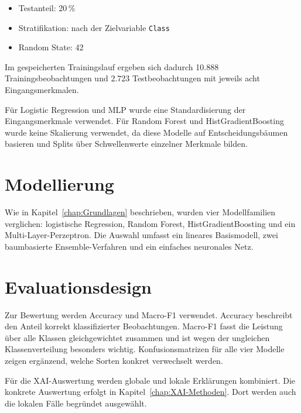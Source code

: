 \begin{itemize}
    \item Testanteil: 20\,\%
    \item Stratifikation: nach der Zielvariable \texttt{Class}
    \item Random State: 42
\end{itemize}

Im gespeicherten Trainingslauf ergeben sich dadurch 10.888 Trainingsbeobachtungen und 2.723 Testbeobachtungen mit jeweils acht Eingangsmerkmalen.

Für Logistic Regression und MLP wurde eine Standardisierung der Eingangsmerkmale verwendet. Für Random Forest und HistGradientBoosting wurde keine Skalierung verwendet, da diese Modelle auf Entscheidungsbäumen basieren und Splits über Schwellenwerte einzelner Merkmale bilden.

\section{Modellierung}

Wie in Kapitel~\ref{chap:Grundlagen} beschrieben, wurden vier Modellfamilien verglichen: logistische Regression, Random Forest, HistGradientBoosting und ein Multi-Layer-Perzeptron. Die Auswahl umfasst ein lineares Basismodell, zwei baumbasierte Ensemble-Verfahren und ein einfaches neuronales Netz.



\section{Evaluationsdesign}

Zur Bewertung werden Accuracy und Macro-F1 verwendet. Accuracy beschreibt den Anteil korrekt klassifizierter Beobachtungen. Macro-F1 fasst die Leistung über alle Klassen gleichgewichtet zusammen und ist wegen der ungleichen Klassenverteilung besonders wichtig. Konfusionsmatrizen für alle vier Modelle zeigen ergänzend, welche Sorten konkret verwechselt werden.

Für die XAI-Auswertung werden globale und lokale Erklärungen kombiniert. Die konkrete Auswertung erfolgt in Kapitel~\ref{chap:XAI-Methoden}. Dort werden auch die lokalen Fälle begründet ausgewählt.
